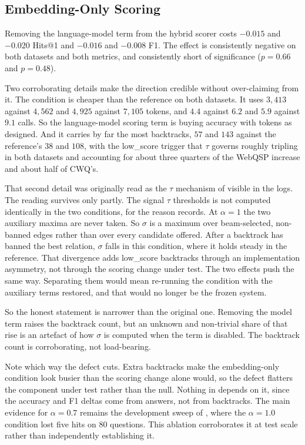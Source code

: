 \subsection{Embedding-Only Scoring}\label{sec:abl-embonly}

Removing the language-model term from the hybrid scorer costs $-0.015$
and $-0.020$ Hits@1 and $-0.016$ and $-0.008$ F1.
The effect is consistently negative on both datasets and both metrics, and
consistently short of significance ($p = 0.66$ and $p = 0.48$).

Two corroborating details make the direction credible without over-claiming from
it. The condition is cheaper than the reference on both datasets. It uses
$3{,}413$ against $4{,}562$ and $4{,}925$ against $7{,}105$ tokens, and $4.4$
against $6.2$ and $5.9$ against $9.1$ calls. So the language-model scoring term
is buying accuracy with tokens as designed. And it carries by far the most
backtracks, $57$ and $143$ against the reference's $38$ and $108$, with the
\textsf{low\_score} trigger that $\tau$ governs roughly tripling in both
datasets and accounting for about three quarters of the WebQSP increase and
about half of CWQ's.

That second detail was originally read as the $\tau$ mechanism of
 visible in the logs. The reading survives only partly.
The signal $\tau$ thresholds is not computed identically in the two conditions,
for the reason  records. At $\alpha = 1$ the two
auxiliary maxima are never taken. So $\sigma$ is a maximum over beam-selected,
non-banned edges rather than over every candidate offered. After a backtrack has
banned the best relation, $\sigma$ falls in this condition, where it holds
steady in the reference. That divergence adds \textsf{low\_score} backtracks
through an implementation asymmetry, not through the scoring change under test.
The two effects push the same way. Separating them would mean re-running the
condition with the auxiliary terms restored, and that would no longer be the
frozen system.

So the honest statement is narrower than the original one. Removing the model
term raises the backtrack count, but an unknown and non-trivial share of that
rise is an artefact of how $\sigma$ is computed when the term is disabled. The
backtrack count is corroborating, not load-bearing.

Note which way the defect cuts. Extra backtracks make the embedding-only
condition look busier than the scoring change alone would, so the defect
flatters the component under test rather than the null. Nothing in
 depends on it, since the accuracy and F1 deltas come from
answers, not from backtracks. The main evidence for $\alpha = 0.7$ remains the
development sweep of , where the $\alpha = 1.0$ condition lost
five hits on $80$ questions. This ablation corroborates it at test scale rather
than independently establishing it.

